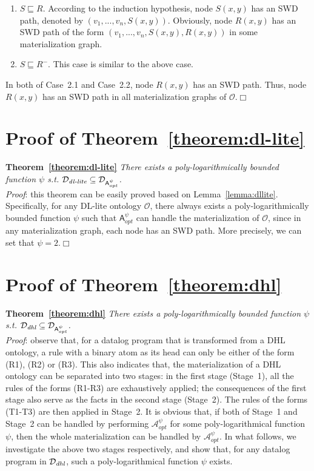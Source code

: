 \documentclass[final,1p,times]{elsarticle}
\begin{document}
\begin{enumerate}[leftmargin=12ex,label=Case~2.\arabic*]
\item $S\sqsubseteq R$. According to the induction hypothesis,
node $S(x,y)$ has an SWD path, denoted by $(v_1,...,v_n,S(x,y))$.
Obviously, node $R(x,y)$
has an SWD path of the form $(v_1,...,v_n,S(x,y),R(x,y))$
in some materialization graph.

\item $S\sqsubseteq R^-$. This case is similar to
the above case.
\end{enumerate}

In both of Case~2.1 and Case~2.2, node $R(x,y)$ has an SWD path. Thus,
node $R(x,y)$ has an SWD path in all materialization graphs of $\mathcal{O}$.\hfill$\Box$

\section{Proof of Theorem~\ref{theorem:dl-lite}}

\textbf{Theorem~\ref{theorem:dl-lite}}
\emph{There exists a poly-logarithmically bounded function $\psi$ s.t.
$\mathcal{D}_{\textit{\text{dl-lite}}}\subseteq\mathcal{D}_{\mathsf{A}_{opt}^{\psi}}$.}\\

\noindent\emph{Proof}: this theorem can be easily proved based on Lemma~\ref{lemma:dllite}.
Specifically, for any DL-lite ontology $\mathcal{O}$,
there always exists a poly-logarithmically bounded function $\psi$ such that
$\mathsf{A}_{opt}^{\psi}$ can handle the materialization of $\mathcal{O}$,
since in any materialization graph, each node has an SWD path.
More precisely, we can set that $\psi=2$.\hfill$\Box$


\section{Proof of Theorem~\ref{theorem:dhl}}

\textbf{Theorem~\ref{theorem:dhl}}
\emph{There exists a poly-logarithmically bounded function $\psi$ s.t.
$\mathcal{D}_{\textit{\text{dhl}}}\subseteq\mathcal{D}_{\mathsf{A}_{opt}^{\psi}}$.}\\

\noindent\emph{Proof}: observe that, for a datalog program that is transformed from a DHL ontology,
a rule with a binary atom as its head can only be either of the form (R1), (R2) or (R3).
This also indicates that, the materialization of a DHL
ontology can be separated into two stages: in the first stage (Stage~1), all the rules
of the forms (R1-R3) are exhaustively applied; the consequences of the first stage
also serve as the facts in the second stage (Stage~2). The rules of the forms (T1-T3)
are then applied in Stage~2.
It is obvious that, if both of Stage~1 and Stage~2 can be handled
by performing $\mathcal{A}_{opt}^\psi$ for some poly-logarithmical function $\psi$, then
the whole materialization can be handled by $\mathcal{A}_{opt}^\psi$.
In what follows, we investigate the above two stages respectively, and show that,
for any datalog program in $\mathcal{D}_{\textit{\text{dhl}}}$,
such a poly-logarithmical function $\psi$ exists.
\end{document}
